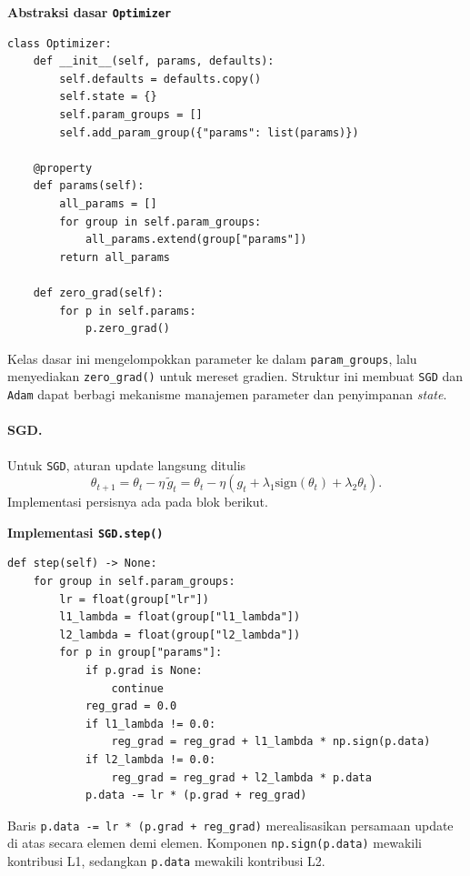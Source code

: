 \documentclass{article}
\begin{document}
\noindent\textbf{Abstraksi dasar \texttt{Optimizer}}\par
\begin{lstlisting}
class Optimizer:
    def __init__(self, params, defaults):
        self.defaults = defaults.copy()
        self.state = {}
        self.param_groups = []
        self.add_param_group({"params": list(params)})

    @property
    def params(self):
        all_params = []
        for group in self.param_groups:
            all_params.extend(group["params"])
        return all_params

    def zero_grad(self):
        for p in self.params:
            p.zero_grad()
\end{lstlisting}
Kelas dasar ini mengelompokkan parameter ke dalam \texttt{param\_groups}, lalu menyediakan \texttt{zero\_grad()} untuk mereset gradien. Struktur ini membuat \texttt{SGD} dan \texttt{Adam} dapat berbagi mekanisme manajemen parameter dan penyimpanan \textit{state}.

\paragraph{SGD.}
Untuk \texttt{SGD}, aturan update langsung ditulis
\begin{equation}
\theta_{t+1}
=
\theta_t-\eta\,\tilde{g}_t
=
\theta_t-\eta\left(g_t+\lambda_1\mathrm{sign}(\theta_t)+\lambda_2\theta_t\right).
\end{equation}
Implementasi persisnya ada pada blok berikut.

\noindent\textbf{Implementasi \texttt{SGD.step()}}\par
\begin{lstlisting}
def step(self) -> None:
    for group in self.param_groups:
        lr = float(group["lr"])
        l1_lambda = float(group["l1_lambda"])
        l2_lambda = float(group["l2_lambda"])
        for p in group["params"]:
            if p.grad is None:
                continue
            reg_grad = 0.0
            if l1_lambda != 0.0:
                reg_grad = reg_grad + l1_lambda * np.sign(p.data)
            if l2_lambda != 0.0:
                reg_grad = reg_grad + l2_lambda * p.data
            p.data -= lr * (p.grad + reg_grad)
\end{lstlisting}
Baris \texttt{p.data -= lr * (p.grad + reg\_grad)} merealisasikan persamaan update di atas secara elemen demi elemen. Komponen \texttt{np.sign(p.data)} mewakili kontribusi L1, sedangkan \texttt{p.data} mewakili kontribusi L2.
\end{document}
